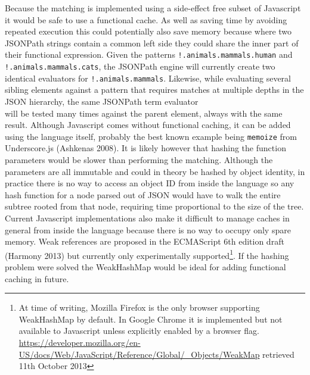 \documentclass[12pt, ]{article}
\begin{document}
Because the matching is implemented using a side-effect free subset of
Javascript it would be safe to use a functional cache. As well as saving
time by avoiding repeated execution this could potentially also save
memory because where two JSONPath strings contain a common left side
they could share the inner part of their functional expression. Given
the patterns \texttt{!.animals.mammals.human} and
\texttt{!.animals.mammals.cats}, the JSONPath engine will currently
create two identical evaluators for \texttt{!.animals.mammals}.
Likewise, while evaluating several sibling elements against a pattern
that requires matches at multiple depths in the JSON hierarchy, the same
JSONPath term evaluator\\will be tested many times against the parent
element, always with the same result. Although Javascript comes without
functional caching, it can be added using the language itself, probably
the best known example being \texttt{memoize} from Underscore.js
(Ashkenas 2008). It is likely however that hashing the function
parameters would be slower than performing the matching. Although the
parameters are all immutable and could in theory be hashed by object
identity, in practice there is no way to access an object ID from inside
the language so any hash function for a node parsed out of JSON would
have to walk the entire subtree rooted from that node, requiring time
proportional to the size of the tree. Current Javascript implementations
also make it difficult to manage caches in general from inside the
language because there is no way to occupy only spare memory. Weak
references are proposed in the ECMAScript 6th edition draft (Harmony
2013) but currently only experimentally supported\footnote{At time of
  writing, Mozilla Firefox is the only browser supporting WeakHashMap by
  default. In Google Chrome it is implemented but not available to
  Javascript unless explicitly enabled by a browser flag.
  \url{https://developer.mozilla.org/en-US/docs/Web/JavaScript/Reference/Global/_Objects/WeakMap}
  retrieved 11th October 2013}. If the hashing problem were solved the
WeakHashMap would be ideal for adding functional caching in future.
\end{document}

